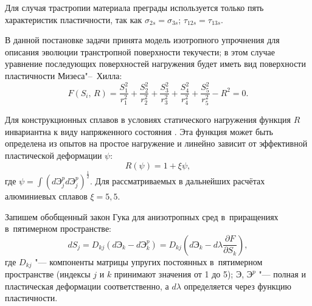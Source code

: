 Для случая трастропии материала преграды используется только пять характеристик пластичности, так как
$\sigma _{2s} = \sigma _{3s}$; $\tau _{12s} =
\tau _{13s}$.

В данной постановке задачи принята модель изотропного упрочнения для
описания эволюции транстропной поверхности текучести; в этом случае
уравнение последующих поверхностей нагружения будет иметь вид поверхности
пластичности Мизеса"--~Хилла:
\begin{equation}
\label{tuch:eq2}
F(S_i,\,R) = \frac{S_1^2 }{r_1^2 } + \frac{S_2^2}{r_2^2 } + \frac{S_3^2
}{r_3^2 } + \frac{S_4^2}{r_4^2} + \frac{S_5^2}{r_5^2} - R^2 = 0.
\end{equation}

Для конструкционных сплавов в условиях статического нагружения функция $R $ инвариантна
к виду напряженного состояния \cite{tuch:bib4}. Эта функция может быть определена из
опытов на простое нагружение и линейно зависит от эффективной пластической
деформации $\psi$:
\[
R(\psi) = 1 + \xi \psi,
\]
где $\psi = \displaystyle \int \left( d\text{Э}_j^p d\text{Э}_j^p  \right)^{\frac{1}{2}}$. Для рассматриваемых в дальнейших расчётах алюминиевых сплавов $\xi = 5,5$.

Запишем обобщенный закон Гука для анизотропных сред в~приращениях в~пятимерном пространстве:
\[
dS_j = D_{kj} \left( d\text{Э}_k - d\text{Э}_k^p  \right) = D_{kj} \left( d\text{Э}_k -
d\lambda \frac{\partial F}{\partial S_k } \right),
\]
где $D_{kj}$ "--- компоненты матрицы упругих постоянных в~пятимерном пространстве (индексы  $j$ и $k$ принимают значения от 1 до 5);
$\text{Э}$, $\text{Э}^p$ "--- полная и пластическая деформации соответственно, а $d\lambda $ определяется через функцию пластичности.

